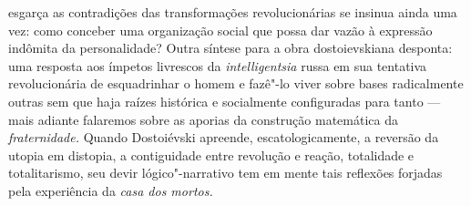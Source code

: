 esgarça as contradições das transformações revolucionárias se insinua
ainda uma vez: como conceber uma organização social que possa dar vazão
à expressão indômita da personalidade? Outra síntese para a obra
dostoievskiana desponta: uma resposta aos ímpetos livrescos da
\emph{intelligentsia} russa em sua tentativa revolucionária de
esquadrinhar o homem e fazê"-lo viver sobre bases radicalmente outras sem
que haja raízes histórica e socialmente configuradas para tanto --- mais
adiante falaremos sobre as aporias da construção matemática da
\emph{fraternidade.} Quando Dostoiévski apreende, escatologicamente, a
reversão da utopia em distopia, a contiguidade entre revolução e reação,
totalidade e totalitarismo, seu devir lógico"-narrativo tem em mente tais
reflexões forjadas pela experiência da \emph{casa dos mortos. }

